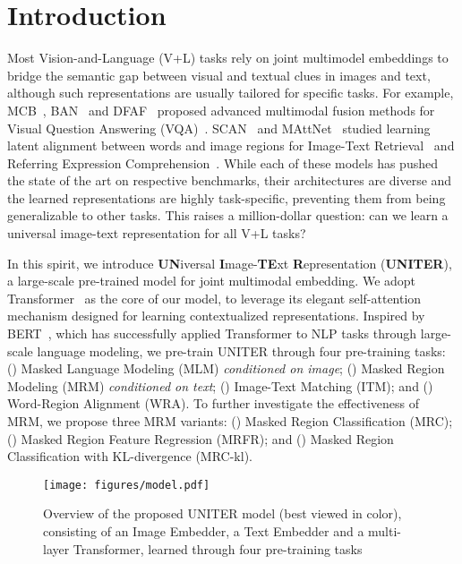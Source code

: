 \documentclass[runningheads]{llncs}
\begin{document}
\section{Introduction}


Most Vision-and-Language (V+L) tasks rely on joint multimodel embeddings to bridge the semantic gap between visual and textual clues in images and text, although such representations are usually tailored for specific tasks.
For example, MCB~\cite{fukui2016multimodal}, BAN~\cite{kim2018bilinear} and DFAF~\cite{gao2019dynamic} proposed advanced multimodal fusion methods for Visual Question Answering (VQA)~\cite{VQA}.
SCAN~\cite{lee2018stacked} and MAttNet~\cite{yu2018mattnet} studied learning latent alignment between words and image regions for Image-Text Retrieval~\cite{wang2016learning} and Referring Expression Comprehension~\cite{kazemzadeh2014referitgame}.
While each of these models has pushed the state of the art on respective benchmarks, their architectures are diverse and the learned representations are highly task-specific, preventing them from being generalizable to other tasks.
This raises a million-dollar question: can we learn a universal image-text representation for all V+L tasks?

In this spirit, we introduce \textbf{UN}iversal \textbf{I}mage-\textbf{TE}xt \textbf{R}epresentation \linebreak (\textbf{UNITER}), a large-scale pre-trained model for joint multimodal embedding.
We adopt Transformer~\cite{vaswani2017attention} as the core of our model, to leverage its elegant self-attention mechanism designed for learning contextualized representations.
Inspired by BERT~\cite{devlin2018bert}, 
which has successfully applied Transformer to NLP tasks through large-scale language modeling, 
we pre-train UNITER through four pre-training tasks: 
() Masked Language Modeling (MLM) \emph{conditioned on image}; () Masked Region Modeling (MRM) \emph{conditioned on text}; () Image-Text Matching (ITM); and () Word-Region Alignment (WRA).
To further investigate the effectiveness of MRM, we propose three MRM variants: () Masked Region Classification (MRC); () Masked Region Feature Regression (MRFR); and () Masked Region Classification with KL-divergence (MRC-kl). 

\begin{figure*}[!t]
\centering
  \texttt{[image: figures/model.pdf]}
 \caption{\small{Overview of the proposed UNITER model (best viewed in color), consisting of an Image Embedder, a Text Embedder and a multi-layer Transformer, learned through four pre-training tasks}}
  \label{fig:model}
\end{figure*} 
\end{document}
